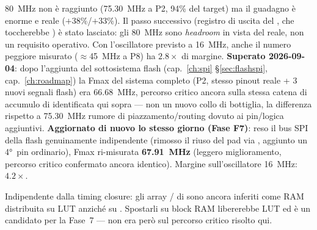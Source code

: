 \begin{fnnote}
80~MHz non è raggiunto (75.30~MHz a P2, 94\% del target) ma il guadagno è enorme e reale
($+38\%$/$+33\%$). Il passo successivo (registro di uscita del , che
toccherebbe ) è stato lasciato: gli 80~MHz sono \emph{headroom} in vista
del  reale, non un requisito operativo. Con l'oscillatore previsto a 16~MHz,
anche il numero peggiore misurato ($\approx$45~MHz a P8) ha $2.8\times$ di margine.
\textbf{Superato 2026-09-04}: dopo l'aggiunta del sottosistema flash (cap.~\ref{ch:spi}
§\ref{sec:flashspi}, cap.~\ref{ch:roadmap}) la Fmax del sistema completo (P2, stesso
pinout reale + 3 nuovi segnali flash) era 66.68~MHz, percorso critico ancora sulla
stessa catena di accumulo di  identificata qui sopra --- non un
nuovo collo di bottiglia, la differenza rispetto a 75.30~MHz rumore di piazzamento/routing
dovuto ai pin/logica aggiuntivi. \textbf{Aggiornato di nuovo lo stesso giorno (Fase F7)}:
reso il bus SPI della flash genuinamente indipendente (rimosso il riuso del pad 
via , aggiunto un 4°~pin  ordinario), Fmax ri-misurata
\textbf{67.91~MHz} (leggero miglioramento, percorso critico confermato ancora identico).
Margine sull'oscillatore 16~MHz: $4.2\times$.
\end{fnnote}

\begin{fnnote}
Indipendente dalla timing closure: gli array / di
 sono ancora inferiti come RAM distribuita su LUT anziché su
. Spostarli su block RAM libererebbe LUT ed è un candidato per la Fase~7 ---
non era però sul percorso critico risolto qui.
\end{fnnote}
